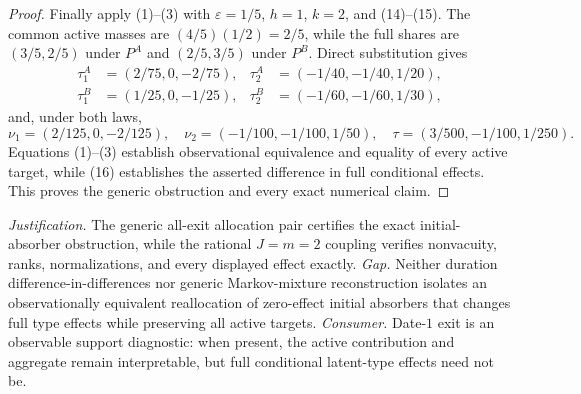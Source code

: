 \documentclass{article}
\begin{document}
\begin{proof}
Finally apply (1)--(3) with \(\varepsilon=1/5\), \(h=1\), \(k=2\), and (14)--(15).  The common active masses are \((4/5)(1/2)=2/5\), while the full shares are \((3/5,2/5)\) under \(P^A\) and \((2/5,3/5)\) under \(P^B\).  Direct substitution gives
\[
\begin{aligned}
 \tau_1^A&=(2/75,0,-2/75),&
 \tau_2^A&=(-1/40,-1/40,1/20),\\
 \tau_1^B&=(1/25,0,-1/25),&
 \tau_2^B&=(-1/60,-1/60,1/30),
\end{aligned}
\tag{16}
\]
and, under both laws,
\[
 \nu_1=(2/125,0,-2/125),\quad
 \nu_2=(-1/100,-1/100,1/50),\quad
 \tau=(3/500,-1/100,1/250).
\tag{17}
\]
Equations (1)--(3) establish observational equivalence and equality of every active target, while (16) establishes the asserted difference in full conditional effects.  This proves the generic obstruction and every exact numerical claim.
\end{proof}
\par\smallskip\noindent \textit{Justification.} The generic all-exit allocation pair certifies the exact initial-absorber obstruction, while the rational \(J=m=2\) coupling verifies nonvacuity, ranks, normalizations, and every displayed effect exactly. \textit{Gap.} Neither duration difference-in-differences nor generic Markov-mixture reconstruction isolates an observationally equivalent reallocation of zero-effect initial absorbers that changes full type effects while preserving all active targets. \textit{Consumer.} Date-\(1\) exit is an observable support diagnostic: when present, the active contribution and aggregate remain interpretable, but full conditional latent-type effects need not be.
\end{document}
